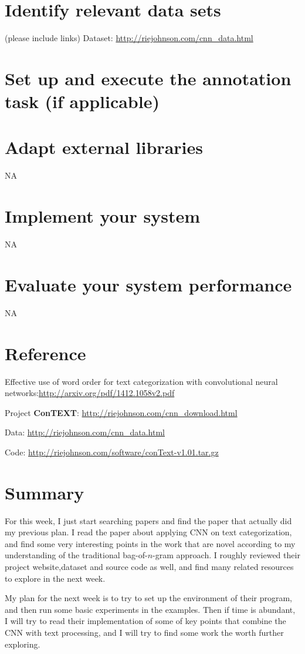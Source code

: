 \documentclass{article}
\begin{document}
\section{Identify relevant data sets}
 
(please include links) 
Dataset: \url{http://riejohnson.com/cnn_data.html}


\section{Set up and execute the annotation task (if applicable)} 



\section{Adapt external libraries}

NA


\section{Implement your system}

NA

\section{Evaluate your system performance}

NA


\section{Reference}

Effective use of word order for text categorization with convolutional neural networks:\url{http://arxiv.org/pdf/1412.1058v2.pdf}

Project \textbf{ConTEXT}: \url{http://riejohnson.com/cnn_download.html}

Data: \url{http://riejohnson.com/cnn_data.html}

Code: \url{http://riejohnson.com/software/conText-v1.01.tar.gz}


\section{Summary}

For this week, I just start searching papers and find the paper that actually did my previous plan. I read the paper about applying CNN on text categorization, and find some very interesting points in the work that are novel according to my understanding of the traditional bag-of-$n$-gram approach. I roughly reviewed their project website,dataset and source code as well, and find many related resources to explore in the next week.

My plan for the next week is to try to set up the environment of their program, and then run some basic experiments in the examples. Then if time is abundant, I will try to read their implementation of some of key points that combine the CNN with text processing, and I will try to find some work the worth further exploring.
\end{document}
